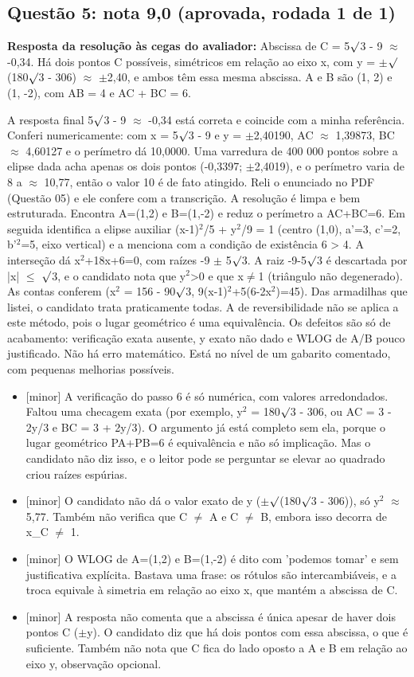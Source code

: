 \documentclass{article}%
\begin{document}
\subsection*{Questão 5: nota 9,0 (aprovada, rodada 1 de 1)}%
\textbf{Resposta da resolução às cegas do avaliador:} Abscissa de C = 5$\surd$3 - 9 $\approx$ -0,34. Há dois pontos C possíveis, simétricos em relação ao eixo x, com y = $\pm$$\surd$(180$\surd$3 - 306) $\approx$ $\pm$2,40, e ambos têm essa mesma abscissa. A e B são (1, 2) e (1, -2), com AB = 4 e AC + BC = 6.\par %
A resposta final 5$\surd$3 - 9 $\approx$ -0,34 está correta e coincide com a minha referência. Conferi numericamente: com x = 5$\surd$3 - 9 e y = $\pm$2,40190, AC $\approx$ 1,39873, BC $\approx$ 4,60127 e o perímetro dá 10,0000. Uma varredura de 400 000 pontos sobre a elipse dada acha apenas os dois pontos (-0,3397; $\pm$2,4019), e o perímetro varia de 8 a $\approx$ 10,77, então o valor 10 é de fato atingido. Reli o enunciado no PDF (Questão 05) e ele confere com a transcrição. A resolução é limpa e bem estruturada. Encontra A=(1,2) e B=(1,-2) e reduz o perímetro a AC+BC=6. Em seguida identifica a elipse auxiliar (x-1)$^2$/5 + y$^2$/9 = 1 (centro (1,0), a'=3, c'=2, b'$^2$=5, eixo vertical) e a menciona com a condição de existência 6 > 4. A interseção dá x$^2$+18x+6=0, com raízes -9 $\pm$ 5$\surd$3. A raiz -9-5$\surd$3 é descartada por |x| $\leq$ $\surd$3, e o candidato nota que y$^2$>0 e que x$\neq$1 (triângulo não degenerado). As contas conferem (x$^2$ = 156 - 90$\surd$3, 9(x-1)$^2$+5(6-2x$^2$)=45). Das armadilhas que listei, o candidato trata praticamente todas. A de reversibilidade não se aplica a este método, pois o lugar geométrico é uma equivalência. Os defeitos são só de acabamento: verificação exata ausente, y exato não dado e WLOG de A/B pouco justificado. Não há erro matemático. Está no nível de um gabarito comentado, com pequenas melhorias possíveis.%
\begin{itemize}%
\item%
{[}minor{]} A verificação do passo 6 é só numérica, com valores arredondados. Faltou uma checagem exata (por exemplo, y$^2$ = 180$\surd$3 - 306, ou AC = 3 - 2y/3 e BC = 3 + 2y/3). O argumento já está completo sem ela, porque o lugar geométrico PA+PB=6 é equivalência e não só implicação. Mas o candidato não diz isso, e o leitor pode se perguntar se elevar ao quadrado criou raízes espúrias.%
\item%
{[}minor{]} O candidato não dá o valor exato de y ($\pm$$\surd$(180$\surd$3 - 306)), só y$^2$ $\approx$ 5,77. Também não verifica que C $\neq$ A e C $\neq$ B, embora isso decorra de x\_C $\neq$ 1.%
\item%
{[}minor{]} O WLOG de A=(1,2) e B=(1,-2) é dito com 'podemos tomar' e sem justificativa explícita. Bastava uma frase: os rótulos são intercambiáveis, e a troca equivale à simetria em relação ao eixo x, que mantém a abscissa de C.%
\item%
{[}minor{]} A resposta não comenta que a abscissa é única apesar de haver dois pontos C ($\pm$y). O candidato diz que há dois pontos com essa abscissa, o que é suficiente. Também não nota que C fica do lado oposto a A e B em relação ao eixo y, observação opcional.%
\end{itemize}%
\end{document}
